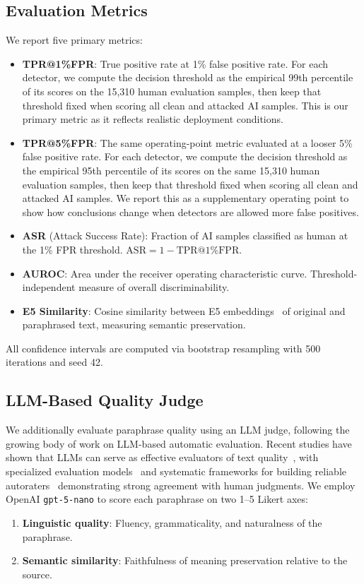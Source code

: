 \documentclass[11pt]{article}
\begin{document}
\subsection{Evaluation Metrics}

We report five primary metrics:
\begin{itemize}[leftmargin=*,itemsep=2pt]
  \item \textbf{TPR@1\%FPR}: True positive rate at 1\% false positive rate. For each detector, we compute the decision threshold as the empirical 99th percentile of its scores on the 15,310 human evaluation samples, then keep that threshold fixed when scoring all clean and attacked AI samples. This is our primary metric as it reflects realistic deployment conditions.
  \item \textbf{TPR@5\%FPR}: The same operating-point metric evaluated at a looser 5\% false positive rate. For each detector, we compute the decision threshold as the empirical 95th percentile of its scores on the same 15,310 human evaluation samples, then keep that threshold fixed when scoring all clean and attacked AI samples. We report this as a supplementary operating point to show how conclusions change when detectors are allowed more false positives.
  \item \textbf{ASR} (Attack Success Rate): Fraction of AI samples classified as human at the 1\% FPR threshold. $\text{ASR} = 1 - \text{TPR@1\%FPR}$.
  \item \textbf{AUROC}: Area under the receiver operating characteristic curve. Threshold-independent measure of overall discriminability.
  \item \textbf{E5 Similarity}: Cosine similarity between E5 embeddings~\cite{wang2022e5} of original and paraphrased text, measuring semantic preservation.
\end{itemize}

All confidence intervals are computed via bootstrap resampling with 500 iterations and seed 42.

\subsection{LLM-Based Quality Judge}

We additionally evaluate paraphrase quality using an LLM judge, following the growing body of work on LLM-based automatic evaluation. Recent studies have shown that LLMs can serve as effective evaluators of text quality~\cite{fu2023gptscore}, with specialized evaluation models~\cite{kim2024prometheus2} and systematic frameworks for building reliable autoraters~\cite{vu2024foundationalautoraters} demonstrating strong agreement with human judgments. We employ OpenAI \texttt{gpt-5-nano} to score each paraphrase on two 1--5 Likert axes:
\begin{enumerate}[leftmargin=*,itemsep=2pt]
  \item \textbf{Linguistic quality}: Fluency, grammaticality, and naturalness of the paraphrase.
  \item \textbf{Semantic similarity}: Faithfulness of meaning preservation relative to the source.
\end{enumerate}
\end{document}
